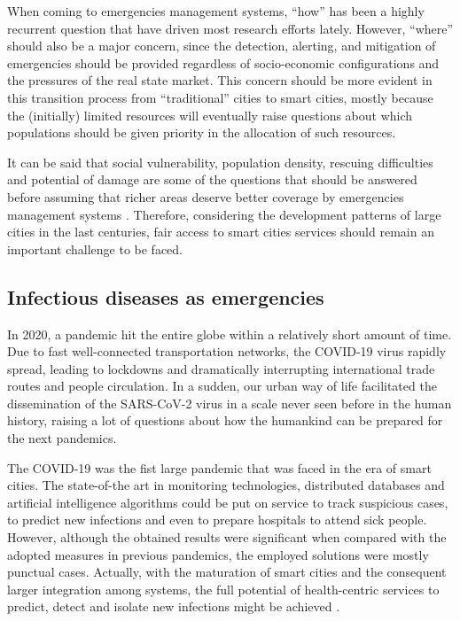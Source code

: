 \begin{refsection}
When coming to emergencies management systems, ``how'' has been a highly recurrent question that have driven most research efforts lately. However, ``where'' should also be a major concern, since the detection, alerting, and mitigation of emergencies should be provided regardless of socio-economic configurations and the pressures of the real state market. This concern should be more evident in this transition process from ``traditional'' cities to smart cities, mostly because the (initially) limited resources will eventually raise questions about which populations should be given priority in the allocation of such resources. 

It can be said that social vulnerability, population density, rescuing difficulties and potential of damage are some of the questions that should be answered before assuming that richer areas deserve better coverage by emergencies management systems \cite{emergenciesmetric1}. Therefore, considering the development patterns of large cities in the last centuries, fair access to smart cities services should remain an important challenge to be faced. 

\subsection{Infectious diseases as emergencies}

In 2020, a pandemic hit the entire globe within a relatively short amount of time. Due to fast well-connected transportation networks, the COVID-19 virus rapidly spread, leading to lockdowns and dramatically interrupting international trade routes and people circulation. In a sudden, our urban way of life facilitated the dissemination of the SARS-CoV-2 virus in a scale never seen before in the human history, raising a lot of questions about how the humankind can be prepared for the next pandemics.

The COVID-19 was the fist large pandemic that was faced in the era of smart cities. The state-of-the art in monitoring technologies, distributed databases and artificial intelligence algorithms could be put on service to track suspicious cases, to predict new infections and even to prepare hospitals to attend sick people. However, although the obtained results were significant when compared with the adopted measures in previous pandemics, the employed solutions were mostly punctual cases. Actually, with the maturation of smart cities and the consequent larger integration among systems, the full potential of health-centric services to predict, detect and isolate new infections might be achieved \cite{covidsmartcities2}.


\end{refsection}
